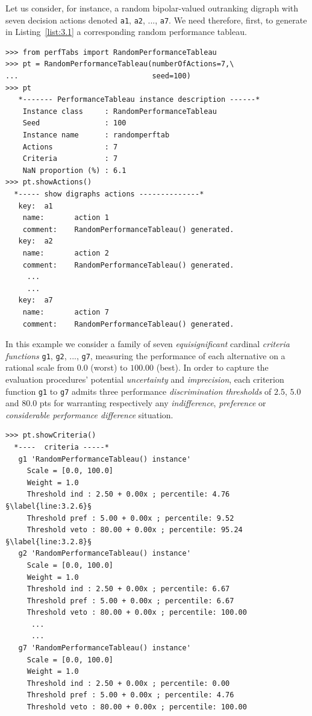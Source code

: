 Let us consider, for instance, a random bipolar-valued outranking digraph with seven decision actions denoted \texttt{a1}, \texttt{a2}, ..., \texttt{a7}. We need therefore, first, to generate in Listing~\vref{list:3.1} a corresponding random performance tableau.
\begin{lstlisting}[caption={Generating a random performance tableau.},label=list:3.1]
>>> from perfTabs import RandomPerformanceTableau
>>> pt = RandomPerformanceTableau(numberOfActions=7,\
...                               seed=100)   
>>> pt
   *------- PerformanceTableau instance description ------*
    Instance class     : RandomPerformanceTableau
    Seed               : 100
    Instance name      : randomperftab
    Actions            : 7
    Criteria           : 7
    NaN proportion (%) : 6.1
>>> pt.showActions()
  *----- show digraphs actions --------------*
   key:  a1
    name:       action 1
    comment:    RandomPerformanceTableau() generated.
   key:  a2
    name:       action 2
    comment:    RandomPerformanceTableau() generated.
     ...
     ...
   key:  a7
    name:       action 7
    comment:    RandomPerformanceTableau() generated.
\end{lstlisting}

In this example we consider a family of seven \emph{equisignificant} cardinal \emph{criteria functions} \texttt{g1}, \texttt{g2}, ..., \texttt{g7}, measuring the performance of each alternative on a rational scale from $0.0$ (worst) to $100.00$ (best). In order to capture the evaluation procedures' potential \emph{uncertainty} and \emph{imprecision}, each criterion function \texttt{g1} to \texttt{g7} admits three performance \emph{discrimination thresholds} of $2.5$, $5.0$ and $80.0$ pts for warranting respectively any \emph{indifference}, \emph{preference} or \emph{considerable performance difference} situation.
\begin{lstlisting}[caption={Inspecting the performance criteria.},label=list:3.2]
>>> pt.showCriteria()
  *----  criteria -----*
   g1 'RandomPerformanceTableau() instance'
     Scale = [0.0, 100.0]
     Weight = 1.0
     Threshold ind : 2.50 + 0.00x ; percentile: 4.76 §\label{line:3.2.6}§
     Threshold pref : 5.00 + 0.00x ; percentile: 9.52
     Threshold veto : 80.00 + 0.00x ; percentile: 95.24 §\label{line:3.2.8}§
   g2 'RandomPerformanceTableau() instance'
     Scale = [0.0, 100.0]
     Weight = 1.0
     Threshold ind : 2.50 + 0.00x ; percentile: 6.67
     Threshold pref : 5.00 + 0.00x ; percentile: 6.67
     Threshold veto : 80.00 + 0.00x ; percentile: 100.00
      ...
      ...
   g7 'RandomPerformanceTableau() instance'
     Scale = [0.0, 100.0]
     Weight = 1.0
     Threshold ind : 2.50 + 0.00x ; percentile: 0.00
     Threshold pref : 5.00 + 0.00x ; percentile: 4.76
     Threshold veto : 80.00 + 0.00x ; percentile: 100.00
\end{lstlisting}

